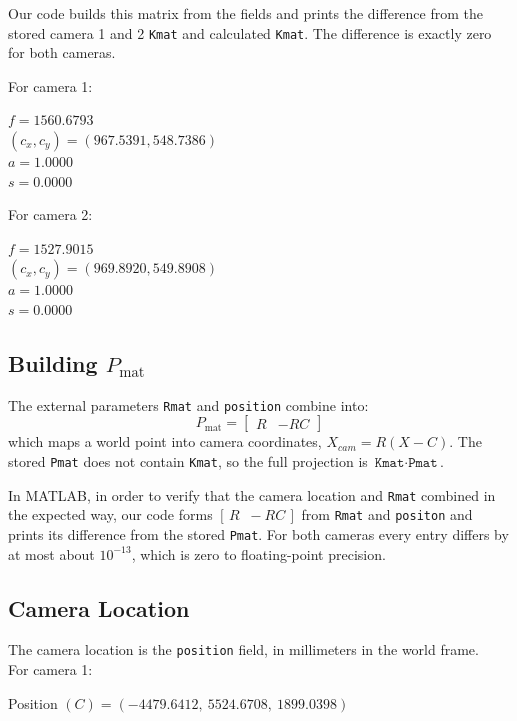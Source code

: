 \documentclass[11pt,letterpaper]{article}
\begin{document}
\medskip

Our code builds this matrix from the fields and prints the difference from the stored camera 1 and 2 \texttt{Kmat} and calculated \texttt{Kmat}. The difference is exactly zero for both cameras.

For camera 1: 
\begin{center}
    $f=1560.6793$
    \\$(c_x, c_y)=(967.5391, 548.7386)$
    \\$a=1.0000$
    \\$s=0.0000$
\end{center}

For camera 2: 
\begin{center}
    $f=1527.9015$
    \\$(c_x, c_y)=(969.8920, 549.8908)$
    \\$a=1.0000$
    \\$s=0.0000$
\end{center}

\subsection*{Building $P_{\text{mat}}$}
The external parameters \texttt{Rmat} and \texttt{position} combine into:
 \[
 P_{\text{mat}} = \begin{bmatrix}
     R & -RC
 \end{bmatrix}
 \]
 which maps a world point into camera coordinates, $X_{cam}=R(X-C)$. The stored \texttt{Pmat} does not contain \texttt{Kmat}, so the full projection is $\texttt{Kmat}\cdot\texttt{Pmat}$.

 In MATLAB, in order to verify that the camera location and \texttt{Rmat} combined in the expected way, our code forms $[\,R\;\;-RC\,]$ from \texttt{Rmat} and \texttt{positon} and prints its difference from the stored \texttt{Pmat}. For both cameras every entry differs by at most about $10^{-13}$, which is zero to floating-point precision. 

 \subsection*{Camera Location}
 The camera location is the \texttt{position} field, in millimeters in the world frame.
 \\For camera 1: 
\begin{center}
    Position  $(C) = (-4479.6412,\ 5524.6708, \ 1899.0398)$
\end{center}
\end{document}
